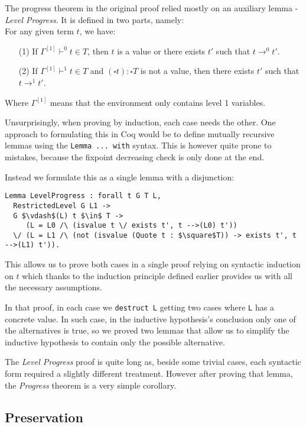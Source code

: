 \documentclass[runningheads]{article}
\begin{document}
The progress theorem in the original proof relied mostly on an auxiliary lemma - \textit{Level Progress}. It is defined in two parts, namely:
\\
For any given term $t$, we have:
\begin{itemize}
  \item[(1)]  If $\Gamma^{[1]} \vdash^0 t \in T$, then $t$ is a value or  there exists $t'$ such that $t \longrightarrow^0 t'$.
  \item[(2)] If $\Gamma^{[1]} \vdash^1 t \in T$ and $(\square t) : \square T$ is not a value,  then there exists $t'$ such that $t \longrightarrow^1 t'$.
\end{itemize}
Where $\Gamma^{[1]}$ means that the environment only contains level 1 variables.

Unsurprisingly, when proving by induction, each case needs the other. One approach to formulating this in Coq would be to define mutually recursive lemmas using the \verb|Lemma ... with| syntax. This is however quite prone to mistakes, because the fixpoint decreasing check is only done at the end.

Instead we formulate this as a single lemma with a disjunction:
\begin{lstlisting}[mathescape=true]
Lemma LevelProgress : forall t G T L,
  RestrictedLevel G L1 ->
  G $\vdash$(L) t $\in$ T ->
     (L = L0 /\ (isvalue t \/ exists t', t -->(L0) t')) 
  \/ (L = L1 /\ (not (isvalue (Quote t : $\square$T)) -> exists t', t -->(L1) t')).
\end{lstlisting}

This allows us to prove both cases in a single proof relying on syntactic induction on $t$ which thanks to the induction principle defined earlier provides us with all the necessary assumptions.

In that proof, in each case we \verb|destruct L| getting two cases where \verb|L| has a concrete value. In such case, in the inductive hypothesis's conclusion only one of the alternatives is true, so we proved two lemmas that allow us to simplify the inductive hypothesis to contain only the possible alternative.

The \textit{Level Progress} proof is quite long as, beside some trivial cases, each syntactic form required a slightly different treatment. However after proving that lemma, the \textit{Progress} theorem is a very simple corollary.

\subsection{Preservation}
\end{document}
